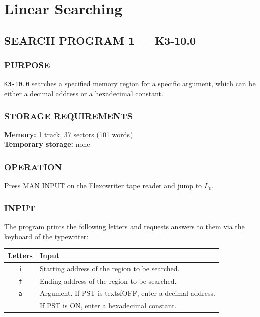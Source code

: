 \section{Linear Searching}
\subsection*{SEARCH PROGRAM 1 --- K3-10.0}

\subsubsection*{PURPOSE}
\texttt{K3-10.0} searches a specified memory region for a specific argument, which can be either a decimal address or a hexadecimal constant.

\subsubsection*{STORAGE REQUIREMENTS}
\textbf{Memory:} 1 track, 37 sectors (101 words) \\
\textbf{Temporary storage:} none

\subsubsection*{OPERATION}
Press \textsf{MAN INPUT} on the Flexowriter tape reader and jump to $L_0$.

\subsubsection*{INPUT}
The program prints the following letters and requests answers to them via the keyboard of the typewriter:

\begin{table}[h!]
\centering
\begin{tabular}{cl}
\toprule
\textbf{Letters} & \textbf{Input} \\
\midrule
\texttt{i} & Starting address of the region to be searched. \\
\texttt{f} & Ending address of the region to be searched. \\
\texttt{a} & Argument. If \textsf{PST} is textsf{OFF}, enter a decimal address. \\
           & If \textsf{PST} is \textsf{ON}, enter a hexadecimal constant. \\
\bottomrule
\end{tabular}
\end{table}

